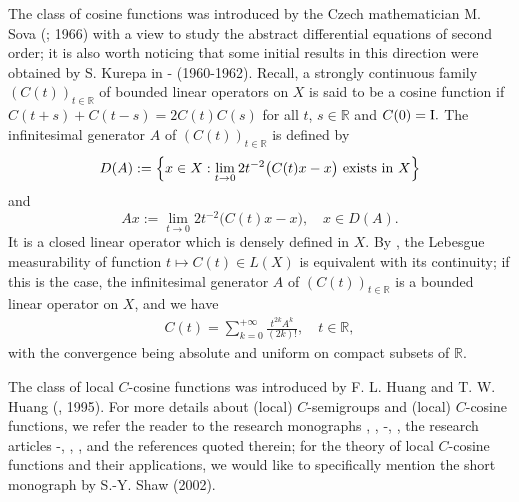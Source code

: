 \documentclass{amsart}
\theoremstyle{definition}
\theoremstyle{remark}
\numberwithin{equation}{section}
\begin{document}
The class of cosine functions was introduced by the Czech mathematician M. Sova (\cite{sova}; 1966) with a view to study the abstract differential equations of second order; it is also worth noticing that some initial results in this direction were obtained by S. Kurepa in \cite{kurepa}-\cite{skurepa} (1960-1962). Recall, a strongly continuous family $(C(t))_{t\in {\mathbb R}}$ of bounded linear operators on $X$ 
is said to be a cosine function if  $C(t+s)+C(t-s)=2C(t)C(s)$ for all $t$, $s\in {\mathbb R}$ and $C(0)={\rm I}.$ The infinitesimal generator $A$ of $(C(t))_{t\in {\mathbb R}}$ is defined by 
$$
D(A):=\Bigl\{x \in X : \lim_{t\rightarrow 0}2t^{-2}\bigl( C(t)x-x\bigr) \mbox{ exists in }X\Bigr\}
$$
and
$$
Ax:=\lim_{t\rightarrow 0}2t^{-2}\bigl( C(t)x-x\bigr) ,\quad x\in D(A).
$$
It is a closed linear operator which is densely defined in $X.$
By \cite[Theorem 1]{skurepa}, the Lebesgue measurability of function $t\mapsto C(t) \in L(X)$ is equivalent with its continuity; if this is the case, the infinitesimal generator $A$ of 
$(C(t))_{t\in {\mathbb R}}$ is a bounded linear operator on $X$, and we have
\begin{align}\label{cc}
C(t)=\sum_{k=0}^{+\infty}\frac{t^{2k}A^{k}}{(2k)!},\quad t\in  {\mathbb R},
\end{align}
with the convergence being absolute and uniform on compact subsets of ${\mathbb R}$.

The class of local $C$-cosine functions was introduced by 
F. L. Huang and
T. W. Huang (\cite{huang}, 1995). For more details about (local) $C$-semigroups and (local) $C$-cosine functions, we refer the reader to the research monographs \cite{l1}, \cite{fadoa}, \cite{knjiga}-\cite{FKP}, \cite{mli}, the research articles \cite{ksho11}-\cite{ksho12}, \cite{lishaw2007}, \cite{pshaw}, \cite{shaw2005} and the references quoted therein; for the theory of local $C$-cosine functions and their applications, we would like to specifically mention the short monograph \cite{tajw} by S.-Y. Shaw (2002).
\end{document}
